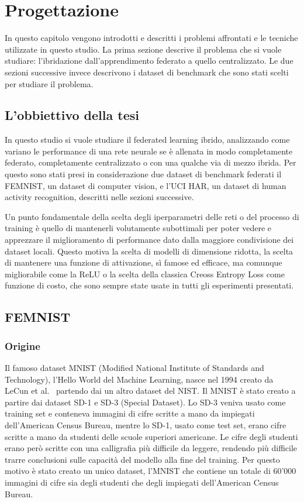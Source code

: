 \chapter{Progettazione}
In questo capitolo vengono introdotti e descritti i problemi affrontati 
e le tecniche utilizzate in questo studio. La prima sezione descrive 
il problema che si vuole studiare: l'ibridazione dall'apprendimento 
federato a quello centralizzato. Le due sezioni successive invece 
descrivono i dataset di benchmark che sono stati scelti per studiare 
il problema.


\section{L'obbiettivo della tesi}
In questo studio si vuole studiare il federated learning ibrido,
analizzando come variano le performance di una rete neurale se è 
allenata in modo completamente federato, completamente centralizzato 
o con una qualche via di mezzo ibrida. Per questo sono stati presi in
considerazione due dataset di benchmark federati il FEMNIST, 
un dataset di computer vision, e l'UCI HAR, un dataset di human activity
recognition, descritti nelle sezioni successive.

Un punto fondamentale della scelta degli iperparametri delle reti o 
del processo di training è quello di 
mantenerli volutamente subottimali per poter vedere e apprezzare il 
miglioramento di performance dato dalla maggiore condivisione dei 
dataset locali. Questo motiva la scelta di modelli di dimensione 
ridotta, la scelta di mantenere una funzione di attivazione, sì 
famose ed efficace, ma comunque migliorabile come la ReLU o la scelta 
della classica Creoss Entropy Loss come funzione di costo, che sono 
sempre state usate in tutti gli esperimenti presentati.


\section{FEMNIST}
\subsection{Origine}
Il famoso dataset MNIST (Modified National Institute of Standards and
Technology), l'Hello World del Machine Learning, nasce nel 1994 creato 
da LeCun et al.~\cite{lecun1998mnist} partendo dai un altro dataset 
del NIST.
Il MNIST è stato creato a partire dai dataset SD-1 e SD-3 (Special
Dataset). Lo SD-3 veniva usato come training set e conteneva immagini
di cifre scritte a mano da impiegati dell'American Census Bureau,
mentre lo SD-1, usato come test set, erano cifre scritte a mano da 
studenti delle scuole superiori americane. Le cifre degli studenti
erano però scritte con una calligrafia più difficile da leggere, rendendo più 
difficile trarre conclusioni sulle capacità del modello alla fine del
training. Per questo motivo è stato creato un unico dataset, l'MNIST 
che contiene un totale di 60'000 immagini di cifre sia degli studenti
che degli impiegati dell'American Census Bureau.

